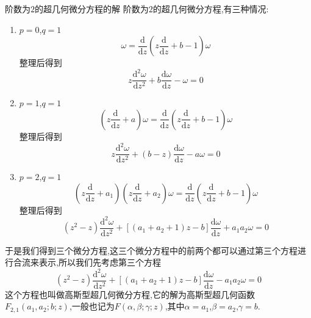 \documentclass[zihao=-4,a4paper]{ctexart}
\begin{document}
\begin{mproof}{阶数为$2$的超几何微分方程的解}
	阶数为$2$的超几何微分方程,有三种情况:

	\begin{enumerate}
		\item $p=0$,$q=1$
		\begin{equation*}
			{\omega} = \frac{ \text{d} }{ \text{d} {z} } \left( {z} \frac{ \text{d} }{ \text{d} {z} } + {b} - 1 \right) {\omega}
		\end{equation*}
		整理后得到
		\begin{equation}
			{z} \frac{ { \text{d} }^{2} {\omega} }{ \text{d} {z}^{2} } + {b} \frac{ \text{d} {\omega} }{ \text{d} {z} } - {\omega} = 0
		\end{equation}

		\item $p=1$,$q=1$
		\begin{equation*}
			\left( {z} \frac{ \text{d} }{ \text{d} {z} } + {a} \right) {\omega} = \frac{ \text{d} }{ \text{d} {z} } \left( {z} \frac{ \text{d} }{ \text{d} {z} } + {b} - 1 \right) {\omega}
		\end{equation*}
		整理后得到
		\begin{equation}
			{z} \frac{ { \text{d} }^{2} {\omega} }{ \text{d} {z}^{2} } + \left( {b} - {z} \right) \frac{ \text{d} {\omega} }{ \text{d} {z} } - {a} {\omega} = 0
		\end{equation}

		\item $p=2$,$q=1$
		\begin{equation*}
			\left( {z} \frac{ \text{d} }{ \text{d} {z} } + {a}_{1} \right) \left( {z} \frac{ \text{d} }{ \text{d} {z} } + {a}_{2} \right) {\omega} = \frac{ \text{d} }{ \text{d} {z} } \left( {z} \frac{ \text{d} }{ \text{d} {z} } + {b} - 1 \right) {\omega}
		\end{equation*}
		整理后得到
		\begin{equation}
			\left( {z}^{2} - {z} \right) \frac{ { \text{d} }^{2} {\omega} }{ \text{d} {z}^{2} } + \left[ \left( {a}_{1} + {a}_{2} + 1 \right) {z} - {b} \right] \frac{ \text{d} {\omega} }{ \text{d} {z} } + {a}_{1} {a}_{2} {\omega} = 0
		\end{equation}
	\end{enumerate}

	于是我们得到三个微分方程,这三个微分方程中的前两个都可以通过第三个方程进行合流来表示,所以我们先考虑第三个方程
	\begin{equation*}
			\left( {z}^{2} - {z} \right) \frac{ { \text{d} }^{2} {\omega} }{ \text{d} {z}^{2} } + \left[ \left( {a}_{1} + {a}_{2} + 1 \right) {z} - {b} \right] \frac{ \text{d} {\omega} }{ \text{d} {z} } - {a}_{1} {a}_{2} {\omega} = 0
	\end{equation*}
	这个方程也叫做高斯型超几何微分方程,它的解为高斯型超几何函数$ {F}_{2,1} \left( {a}_{1} , {a}_{2} ; {b} ; {z} \right) $,一般也记为$ {F} \left( {\alpha} , {\beta} ; {\gamma} ; {z} \right) $,其中$ {\alpha} = {a}_{1} $,$ {\beta} = {a}_{2} $,$ {\gamma} = {b} $.


\end{mproof}
\end{document}
